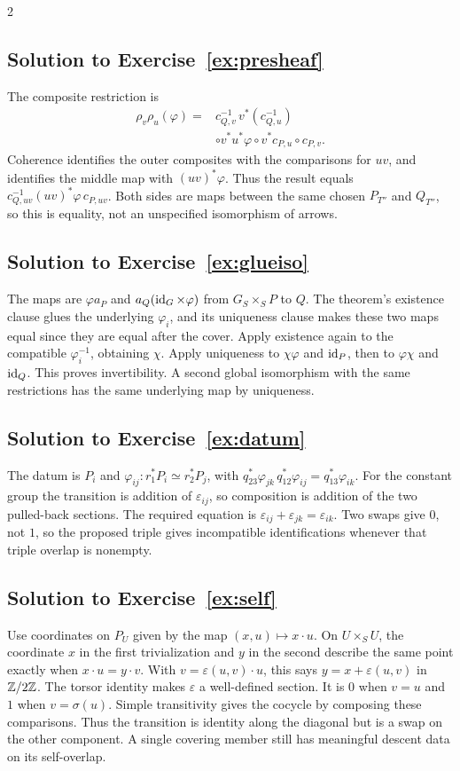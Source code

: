 \documentclass[12pt]{memoir}
\newcommand{\BGsolution}[1]{\subsection*{Solution to Exercise~\ref{#1}}\label{sol:#1}}
\begin{document}
\begin{multicols}{2}
\BGsolution{ex:presheaf}
The composite restriction is
\[
\begin{aligned}
 \rho_v\rho_u(\varphi)
 ={}&c_{Q,v}^{-1}\,v^*(c_{Q,u}^{-1})\\
 &\circ v^*u^*\varphi\circ v^*c_{P,u}\circ c_{P,v}.
\end{aligned}
\]
Coherence identifies the outer composites with the comparisons for
$uv$, and identifies the middle map with $(uv)^*\varphi$.
Thus the result equals $c_{Q,uv}^{-1}(uv)^*\varphi\,c_{P,uv}$.
Both sides are maps between the same chosen $P_{T''}$ and $Q_{T''}$,
so this is equality, not an unspecified isomorphism of arrows.

\BGsolution{ex:glueiso}
The maps are $\varphi a_P$ and $a_Q(\operatorname{id}_G\times\varphi)$ from
$G_S\times_S P$ to $Q$. The theorem's existence clause glues the
underlying $\varphi_i$, and its uniqueness clause makes these two
maps equal since they are equal after the cover. Apply existence again
to the compatible $\varphi_i^{-1}$, obtaining $\chi$. Apply uniqueness
to $\chi\varphi$ and $\operatorname{id}_P$, then to $\varphi\chi$ and $\operatorname{id}_Q$.
This proves invertibility. A second global isomorphism with the same
restrictions has the same underlying map by uniqueness.

\BGsolution{ex:datum}
The datum is $P_i$ and
$\varphi_{ij}:r_1^*P_i\simeq r_2^*P_j$, with
$q_{23}^*\varphi_{jk}\,q_{12}^*\varphi_{ij}=q_{13}^*\varphi_{ik}$.
For the constant group the transition is addition of
$\varepsilon_{ij}$, so composition is addition of the two pulled-back
sections. The required equation is
$\varepsilon_{ij}+\varepsilon_{jk}=\varepsilon_{ik}$.
Two swaps give $0$, not $1$, so the proposed triple gives incompatible
identifications whenever that triple overlap is nonempty.

\BGsolution{ex:self}
Use coordinates on $P_U$ given by the map $(x,u)\mapsto x\cdot u$.
On $U\times_S U$, the coordinate $x$ in the first trivialization and
$y$ in the second describe the same point exactly when
$x\cdot u=y\cdot v$. With $v=\varepsilon(u,v)\cdot u$, this says
$y=x+\varepsilon(u,v)$ in $\mathbb{Z}/2\mathbb{Z}$. The torsor identity makes
$\varepsilon$ a well-defined section. It is $0$ when $v=u$ and $1$
when $v=\sigma(u)$. Simple transitivity gives the cocycle by composing
these comparisons. Thus the transition is identity along the diagonal
but is a swap on the other component. A single covering member still
has meaningful descent data on its self-overlap.


\end{multicols}
\end{document}

